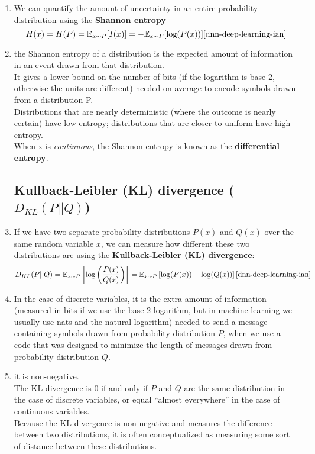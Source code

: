 \begin{enumerate}[itemsep=0.2cm]
    \item We can quantify the amount of uncertainty in an entire probability distribution using the \textbf{Shannon entropy}
    \[
        H(x) = H(P)
        = \mathbb{E}_{x\sim P}[I(x)]
        = -\mathbb{E}_{x\sim P}[\log(P(x))]
        \hfill \text{\cite{dnn-deep-learning-ian}}
    \]

    \item  the Shannon entropy of a distribution is the expected amount of information in an event drawn from that distribution.\\
    It gives a lower bound on the number of bits (if the logarithm is base 2, otherwise the units are different) needed on average to encode symbols drawn from a distribution P.\\
    Distributions that are nearly deterministic (where the outcome is nearly certain) have low entropy; distributions that are closer to uniform have high entropy.\\ 
    When x is \textit{continuous}, the Shannon entropy is known as the \textbf{differential entropy}.

\subsection{Kullback-Leibler (KL) divergence ($D_{KL}(P||Q)$)}\label{probability: Kullback-Leibler (KL) divergence}

    \item If we have two separate probability distributions $P(x)$ and $Q(x)$ over the same random variable $x$, we can measure how different these two distributions are using the \textbf{Kullback-Leibler (KL) divergence}:
    \[
        D_{KL}(P||Q)
        = \mathbb{E}_{x\sim P} \dSquareBrac{\log\dParenBrac{\dfrac{P(x)}{Q(x)}}}
        = \mathbb{E}_{x\sim P} \dSquareBrac{\log(P(x)) - \log(Q(x))}
        \hfill \text{\cite{dnn-deep-learning-ian}}
    \]

    \item In the case of discrete variables, it is the extra amount of information (measured in bits if we use the base 2 logarithm, but in machine learning we usually use nats and the natural logarithm) needed to send a message containing symbols drawn from probability distribution $P$, when we use a code that was designed to minimize the length of messages drawn from probability distribution $Q$.

    \item it is non-negative.\\
    The KL divergence is $0$ if and only if $P$ and $Q$ are the same distribution in the case of discrete variables, or equal “almost everywhere” in the case of continuous variables.\\ 
    Because the KL divergence is non-negative and measures the difference between two distributions, it is often conceptualized as measuring some sort of distance between these distributions.


\end{enumerate}
